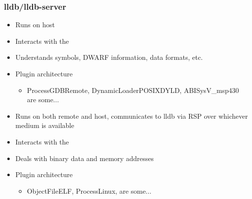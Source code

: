 \begin{frame}[fragile]
\frametitle{lldb/lldb-server}
    \begin{itemize}
        \item Runs on host
        \item Interacts with the 
        \item Understands symbols, DWARF information, data formats, etc.
        \item Plugin architecture
        \begin{itemize}
            \item ProcessGDBRemote, DynamicLoaderPOSIXDYLD, ABISysV\_msp430 are some...
        \end{itemize}
    \end{itemize}
    \begin{itemize}
        \item Runs on both remote and host, communicates to lldb via RSP over whichever medium is available
        \item Interacts with the 
        \item Deals with binary data and memory addresses
        \item Plugin architecture
        \begin{itemize}
            \item ObjectFileELF, ProcessLinux, are some...
        \end{itemize}
    \end{itemize}
\end{frame}

